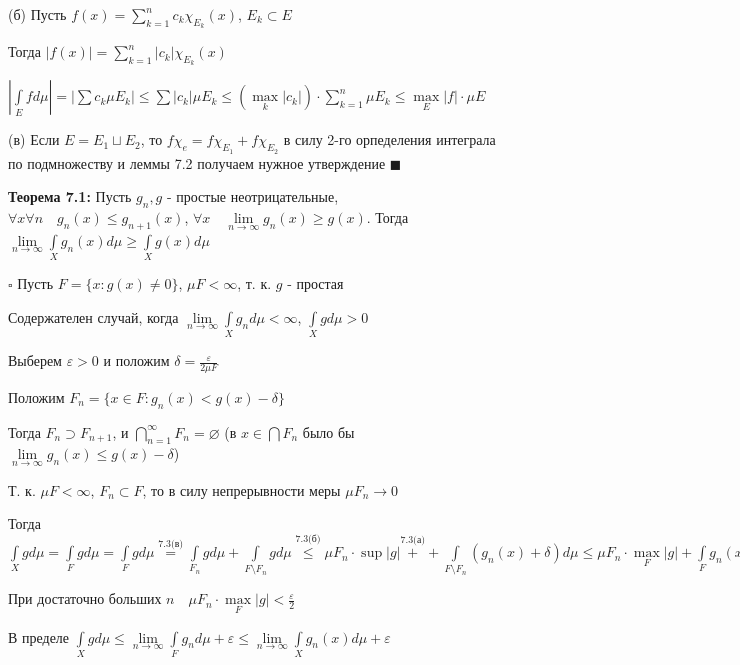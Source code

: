 \documentclass[a4paper]{report}
\begin{document}
(б) Пусть $f(x)=\sum\limits_{k=1}^n c_k\chi_{E_k}(x)$, $E_k\subset E$

Тогда $|f(x)|=\sum\limits_{k=1}^n|c_k|\chi_{E_k}(x)$

$|\displaystyle\int\limits_E fd\mu|=|\sum c_k\mu E_k|\le\sum|c_k|\mu E_k\le(\max\limits_k|c_k|)\cdot\sum\limits_{k=1}^n\mu E_k\le\max\limits_E|f|\cdot\mu E$

(в) Если $E=E_1\sqcup E_2$, то $f\chi_e=f\chi_{E_1}+f\chi_{E_2}$ в силу 2-го орпеделения интеграла по подмножеству и леммы 7.2 получаем нужное утверждение 
$\blacksquare$
\bigskip

\noindent\textbf{Теорема 7.1:} Пусть $g_n,g$ - простые неотрицательные, $\forall x\forall n\quad g_n(x)\le g_{n+1}(x)$, $\forall x\quad\lim\limits_{n\to\infty} g_n(x)\ge g(x)$. Тогда $\lim\limits_{n\to\infty}\displaystyle\int\limits_X g_n(x)d\mu\ge\displaystyle\int\limits_X g(x)d\mu$

\noindent $\square$ Пусть $F=\{x\colon g(x)\ne0\}$, $\mu F<\infty$, т. к. $g$ - простая

Содержателен случай, когда $\lim\limits_{n\to\infty}\displaystyle\int\limits_X g_nd\mu<\infty$, $\displaystyle\int\limits_X gd\mu>0$

Выберем $\varepsilon>0$ и положим $\delta=\displaystyle\frac{\varepsilon}{2\mu F}$

Положим $F_n=\{x\in F\colon g_n(x)<g(x)-\delta\}$

Тогда $F_n\supset F_{n+1}$, и $\bigcap\limits_{n=1}^\infty F_n=\varnothing$ (в $x\in\bigcap F_n$ было бы $\lim\limits_{n\to\infty}g_n(x)\le g(x)-\delta$)

Т. к. $\mu F<\infty$, $F_n\subset F$, то в силу непрерывности меры $\mu F_n\to0$

Тогда $\displaystyle\int\limits_X gd\mu=\displaystyle\int\limits_F gd\mu=\displaystyle\int\limits_F gd\mu\stackrel{7.3\text{(в)}}{=}\displaystyle\int\limits_{F_n} gd\mu+\displaystyle\int\limits_{F\setminus F_n} gd\mu
\stackrel{7.3\text{(б)}}{\le}\mu F_n\cdot \sup|g|\stackrel{7.3\text{(а)}}{+}+\displaystyle\int\limits_{F\setminus F_n}(g_n(x)+\delta)d\mu\le\mu F_n\cdot\max\limits_F|g|+\displaystyle\int\limits_F g_n(x)d\mu+\delta\cdot\mu F$

При достаточно больших $n\quad\mu F_n\cdot\max\limits_F|g|<\frac\varepsilon2$

В пределе $\displaystyle\int\limits_X gd\mu\le\lim\limits_{n\to\infty}\displaystyle\int\limits_F g_n d\mu+\varepsilon\le\lim\limits_{n\to\infty}\displaystyle\int\limits_X g_n(x)d\mu+\varepsilon$
\end{document}
